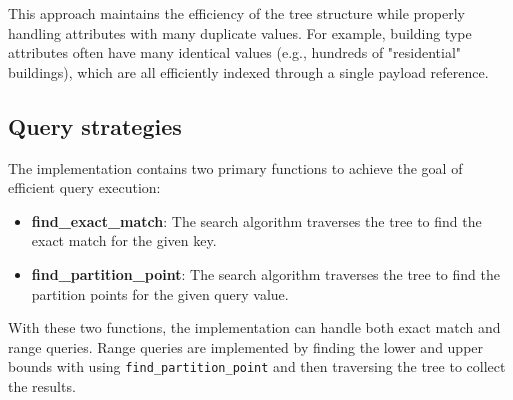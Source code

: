 This approach maintains the efficiency of the tree structure while properly handling attributes with many duplicate values. For example, building type attributes often have many identical values (e.g., hundreds of "residential" buildings), which are all efficiently indexed through a single payload reference.

\subsection{Query strategies}
\label{methodology:attribute_index:query_strategies}

The implementation contains two primary functions to achieve the goal of efficient query execution:

\begin{itemize}
    \item \textbf{find\_exact\_match}: The search algorithm traverses the tree to find the exact match for the given key.
    \item \textbf{find\_partition\_point}: The search algorithm traverses the tree to find the partition points for the given query value.
\end{itemize}

With these two functions, the implementation can handle both exact match and range queries. Range queries are implemented by finding the lower and upper bounds with using \texttt{find\_partition\_point} and then traversing the tree to collect the results.




